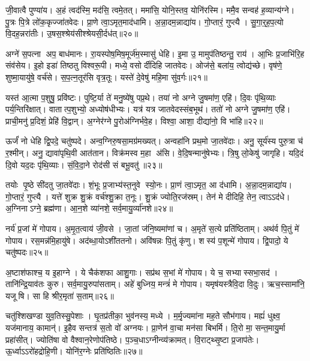 जी॒वात्वै पुण्या॑य। अ॒हं त्वद॑स्मि॒ मद॑सि॒ त्वमे॒तत्। ममा॑सि॒ योनि॒स्तव॒ योनि॑रस्मि। ममै॒व सन्वह॑ ह॒व्यान्य॑ग्ने। पु॒त्रः पि॒त्रे लो॑क॒कृज्जा॑तवेदः। प्रा॒णे त्वा॒ऽमृत॒माद॑धामि। अ॒न्ना॒दम॒न्नाद्या॑य। गो॒प्तारं॒ गुप्त्यै। सु॒गा॒र्॒ह॒प॒त्यो वि॒दह॒न्नरा॑तीः। उ॒षस॒श्श्रेय॑सीश्श्रेयसी॒र्दध॑त्॥२०॥

अग्ने॑ स॒पत्ना अप॒ बाध॑मानः। रा॒यस्पोष॒मिष॒मूर्ज॑म॒स्मासु॑ धेहि। इ॒मा उ॒ मामुप॑तिष्ठन्तु॒ राय॑। आ॒भिः प्र॒जाभि॑रि॒ह संव॑सेय। इ॒हो इडा॑ तिष्ठतु विश्वरू॒पी। मध्ये॒ वसोर्दीदिहि जातवेदः। ओज॑से॒ बला॑य॒ त्वोद्य॑च्छे। वृष॑णे॒ शुष्मा॒यायु॑षे॒ वर्च॑से। स॒प॒त्न॒तूर॑सि वृत्र॒तूः। यस्ते॑ दे॒वेषु॑ महि॒मा सु॑व॒र्गः॥२१॥

यस्त॑ आ॒त्मा प॒शुषु॒ प्रवि॑ष्टः। पुष्टि॒र्या ते॑ मनु॒ष्ये॑षु पप्र॒थे। तया॑ नो अग्ने जु॒षमा॑ण॒ एहि॑। दि॒वः पृ॑थि॒व्याः पर्य॒न्तिरि॑क्षात्। वातात्प॒शुभ्यो॒ अध्योष॑धीभ्यः। यत्र॑ यत्र जातवेदस्संब॒भूथ॑। ततो॑ नो अग्ने जु॒षमा॑ण॒ एहि॑। प्राची॒मनु॑ प्र॒दिशं॒ प्रेहि॑ वि॒द्वान्। अ॒ग्नेर॑ग्ने पु॒रोअ॑ग्निर्भवे॒ह। विश्वा॒ आशा॒ दीद्या॑नो॒ वि भा॑हि॥२२॥

ऊर्जं॑ नो धेहि द्वि॒पदे॒ चतु॑ष्पदे। अन्व॒ग्निरु॒षसा॒मग्र॑मख्यत्। अन्वहा॑नि प्रथ॒मो जा॒तवे॑दाः। अनु॒ सूर्य॑स्य पुरु॒त्रा च॑ र॒श्मीन्। अनु॒ द्यावा॑पृथि॒वी आत॑तान। विक्र॑मस्व म॒हा अ॑सि। वे॒दि॒षन्मानु॑षेभ्यः। त्रि॒षु लो॒केषु॑ जागृहि। यदि॒दं दि॒वो यद॒दः पृ॑थि॒व्याः। सं॒वि॒दा॒ने रोद॑सी सं बभू॒वतु॑॥२३॥

तयोः पृ॒ष्ठे सी॑दतु जा॒तवे॑दाः। शं॒भूः प्र॒जाभ्य॑स्त॒नुवे स्यो॒नः। प्रा॒णं त्वा॒ऽमृत॒ आ द॑धामि। अ॒न्ना॒दम॒न्नाद्या॑य। गो॒प्तारं॒ गुप्त्यै। यत्ते॑ शुक्र शु॒क्रं वर्च॑श्शु॒क्रा त॒नूः। शु॒क्रं ज्योति॒रज॑स्रम्। तेन॑ मे दीदिहि॒ तेन॒ त्वाऽऽद॑धे। अ॒ग्निनाऽग्ने॒ ब्रह्म॑णा। आ॒न॒शे व्या॑नशे॒ सर्व॒मायु॒र्व्या॑नशे॥२४॥

नर्य॑ प्र॒जां मे॑ गोपाय। अ॒मृ॒त॒त्वाय॑ जी॒वसे। जा॒तां ज॑नि॒ष्यमा॑णां च। अ॒मृते॑ स॒त्ये प्रति॑ष्ठिताम्। अथ॑र्व पि॒तुं मे॑ गोपाय। रस॒मन्न॑मि॒हायु॑षे। अद॑ब्धा॒योऽशी॑ततनो। अवि॑षन्नः पि॒तुं कृ॑णु। शस्य॑ प॒शून्मे॑ गोपाय। द्वि॒पादो॒ ये चतु॑ष्पदः॥२५॥

अ॒ष्टाश॑फाश्च॒ य इ॒हाग्ने। ये चैक॑शफा आशु॒गाः। सप्र॑थ स॒भां मे॑ गोपाय। ये च॒ सभ्यास्सभा॒सद॑। तानि॑न्द्रि॒याव॑तः कुरु। सर्व॒मायु॒रुपा॑सताम्। अहे॑ बुध्निय॒ मन्त्रं॑ मे गोपाय। यमृष॑यस्त्रैवि॒दा वि॒दुः। ऋच॒स्सामा॑नि॒ यजूषि। सा हि श्रीर॒मृता॑ स॒ताम्॥२६॥

चतु॑श्शिखण्डा युव॒तिस्सु॒पेशाः। घृ॒तप्र॑तीका॒ भुव॑नस्य॒ मध्ये। म॒र्मृ॒ज्यमा॑ना मह॒ते सौभ॑गाय। मह्यं॑ धुक्ष्व॒ यज॑मानाय॒ कामान्॑। इ॒हैव सन्तत्र॑ स॒तो वो॑ अग्नयः। प्रा॒णेन॑ वा॒चा मन॑सा बिभर्मि। ति॒रो मा॒ सन्त॒मायु॒र्मा प्रहा॑सीत्। ज्योति॑षा वो वैश्वान॒रेणोप॑तिष्ठे। प॒ञ्च॒धाऽग्नीन्व्य॑क्रामत्। वि॒राट्थ्सृ॒ष्टा प्र॒जाप॑तेः। ऊ॒र्ध्वाऽऽरो॑हद्रोहि॒णी। योनि॑र॒ग्नेः प्रति॑ष्ठितिः॥२७॥\anuvakamend[वि॒श॒न्तु॒ न॒ पु॒रू॒चीर्वि॑धेम नि॒धाय॒ यत्तेऽप्र॑दाहाय बृह॒त्यो ब्रह्म॑णा दुवस्यत वि॒श्ववा॑र इ॒ममृ॑ञ्जते पुरो॒गां प्रज॑नयि॒ष्यथो॑ जनि॒ष्यतेऽस्मै॒ मम॑ महि॒म्ना वर्च॑से॒ दध॑थ्सुव॒र्गो भा॑हि संबभू॒वतु॒रायु॒र्व्या॑नशे॒ चतु॑ष्सदस्स॒तां प्र॒जाप॑ते॒र्द्वे च॑]

